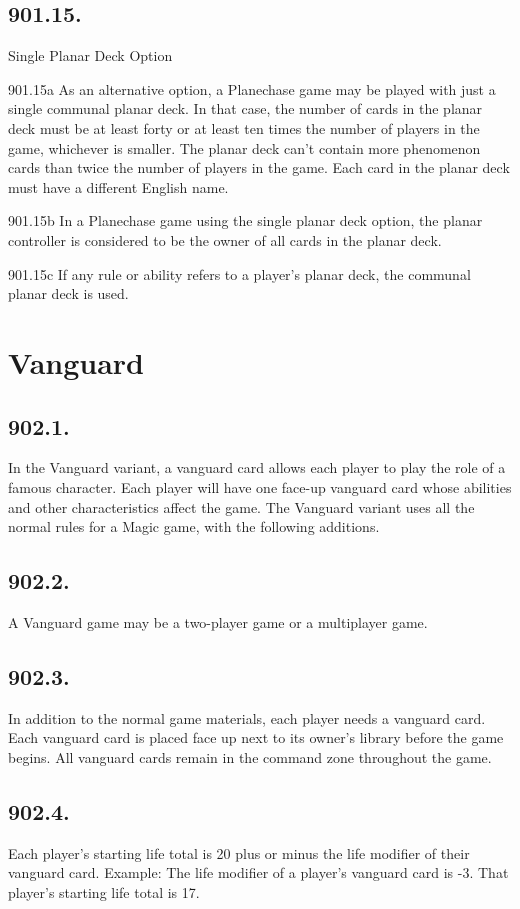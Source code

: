 \subsection*{901.15.}
Single Planar Deck Option

901.15a As an alternative option, a Planechase game may be played with just a single communal planar deck. In that case, the number of cards in the planar deck must be at least forty or at least ten times the number of players in the game, whichever is smaller. The planar deck can’t contain more phenomenon cards than twice the number of players in the game. Each card in the planar deck must have a different English name.

901.15b In a Planechase game using the single planar deck option, the planar controller is considered to be the owner of all cards in the planar deck.

901.15c If any rule or ability refers to a player’s planar deck, the communal planar deck is used.

\section{Vanguard}
\subsection*{902.1.}
In the Vanguard variant, a vanguard card allows each player to play the role of a famous character. Each player will have one face-up vanguard card whose abilities and other characteristics affect the game. The Vanguard variant uses all the normal rules for a Magic game, with the following additions.

\subsection*{902.2.}
A Vanguard game may be a two-player game or a multiplayer game.

\subsection*{902.3.}
In addition to the normal game materials, each player needs a vanguard card. Each vanguard card is placed face up next to its owner’s library before the game begins. All vanguard cards remain in the command zone throughout the game.

\subsection*{902.4.}
Each player’s starting life total is 20 plus or minus the life modifier of their vanguard card.
Example: The life modifier of a player’s vanguard card is -3. That player’s starting life total is 17.

